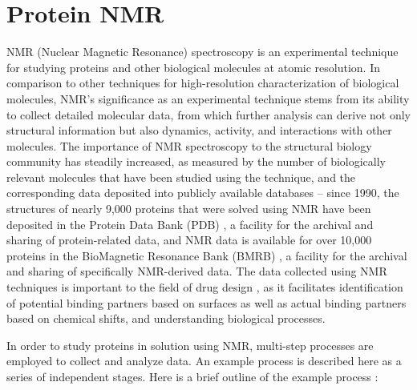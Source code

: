 \section{Protein NMR}
NMR (Nuclear Magnetic Resonance) spectroscopy is an experimental technique for 
studying proteins and other biological molecules at atomic resolution.  In 
comparison to other techniques for high-resolution characterization of 
biological molecules, NMR's significance as an experimental technique stems 
from its ability to collect detailed molecular data, from which further 
analysis can derive not only structural information but also dynamics, 
activity, and interactions with other molecules.  The importance of NMR 
spectroscopy to the structural biology community has steadily increased, as 
measured by the number of biologically relevant molecules that have been 
studied using the technique, and the corresponding data deposited into 
publicly available databases -- since 1990, the structures of nearly 9,000 
proteins that were solved using NMR have been deposited in the Protein Data 
Bank (PDB) \cite{pdb}, a facility for the archival and sharing of protein-related 
data, and NMR data is available for over 10,000 proteins in the BioMagnetic 
Resonance Bank (BMRB) \cite{bmrb}, a facility for the archival and sharing of 
specifically NMR-derived data.  The data collected using NMR techniques is 
important to the field of drug design 
\cite{stockman2002drugs, moore2003leveraging, reckel2011proteorhodopsin}, 
as it facilitates identification of potential 
binding partners based on surfaces as well as actual binding partners based on 
chemical shifts, and understanding biological processes.

In order to study proteins in solution using NMR, multi-step processes are 
employed to collect and analyze data.  An example process is described here 
as a series of independent stages.  Here is a brief outline of the example 
process \cite{guerry2011automated}:


